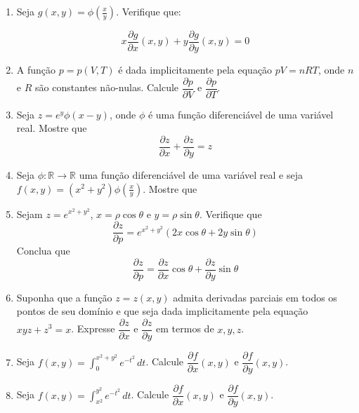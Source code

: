 \documentclass[11pt,a4paper]{article}
\newcommand{\integral}{\displaystyle\int}
\begin{document}
\begin{enumerate}
	\item Seja $g(x,y) = \phi \left(\displaystyle\frac{x}{y}\right)$. Verifique que:
	
	$$x\dfrac{\partial g}{\partial x}(x,y) + y\dfrac{\partial g}{\partial y}(x,y) = 0$$	
	
	
	
	
	
	
	
	
	
	
	
	
	
	
	
	
	
	
	
	
	
	\item A função $p = p(V,T)$ é dada implicitamente pela equação $pV = nRT$, onde $n$ e $R$ são constantes não-nulas. Calcule $\dfrac{\partial p}{\partial V}$ e $\dfrac{\partial p}{\partial T}$. 
	
	\item Seja $z = e^y \phi (x-y)$, onde $\phi$ é uma função diferenciável de uma variável real. Mostre que
	$$\dfrac{\partial z}{\partial x} + \dfrac{\partial z}{\partial y} = z$$
	
	\item Seja $\phi : \mathbb{R} \to \mathbb{R}$ uma função diferenciável de uma variável real e seja $f(x,y) = (x^2 + y^2)\phi \left(\displaystyle\frac{x}{y}\right)$. Mostre que
	
	\item Sejam $z = e^{x^2 + y^2}$, $x = \rho \cos \theta$ e $y = \rho \sin \theta$. Verifique que 
	$$\dfrac{\partial z}{\partial p} = e^{x^2 + y^2} (2x \cos \theta + 2y \sin \theta)$$
	Conclua que
	$$\dfrac{\partial z}{\partial p} = \dfrac{\partial z}{\partial x}\cos \theta + \dfrac{\partial z}{\partial y}\sin \theta $$	
	 
	\item Suponha que a função $z = z(x,y)$ admita derivadas parciais em todos os pontos de seu domínio e que seja dada implicitamente pela equação $xyz + z^3 = x$. Expresse $\dfrac{\partial z}{\partial x}$ e $\dfrac{\partial z}{\partial y}$ em termos de $x,y,z$. 
	
	\item Seja $f(x,y) = \integral_0^{x^2 + y^2} e^{-t^2} \, dt$. Calcule $\dfrac{\partial f}{\partial x}(x,y)$ e $\dfrac{\partial f}{\partial y}(x,y)$.
	
	\item Seja $f(x,y) = \integral_{x^2}^{  y^2} e^{-t^2} \, dt$. Calcule $\dfrac{\partial f}{\partial x}(x,y)$ e $\dfrac{\partial f}{\partial y}(x,y)$.
	

\end{enumerate}
\end{document}
